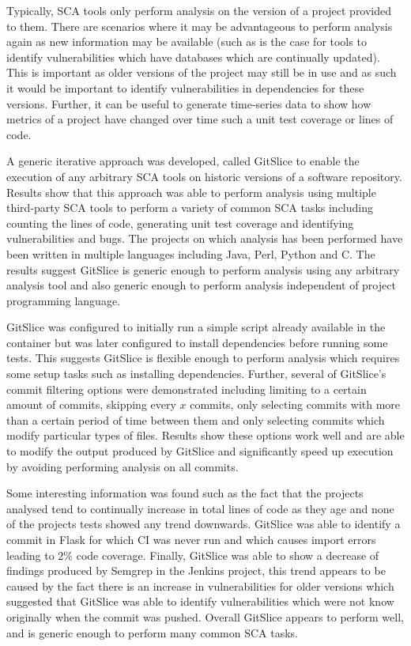 Typically, SCA tools only perform analysis on the version of a project provided to them.
There are scenarios where it may be advantageous to perform analysis again as new information may be available (such as is the case for tools to identify vulnerabilities which have databases which are continually updated).
This is important as older versions of the project may still be in use and as such it would be important to identify vulnerabilities in dependencies for these versions.
Further, it can be useful to generate time-series data to show how metrics of a project have changed over time such a unit test coverage or lines of code.

A generic iterative approach was developed, called GitSlice to enable the execution of any arbitrary SCA tools on historic versions of a software repository.
Results show that this approach was able to perform analysis using multiple third-party SCA tools to perform a variety of common SCA tasks including counting the lines of code, generating unit test coverage and identifying vulnerabilities and bugs.
The projects on which analysis has been performed have been written in multiple languages including Java, Perl, Python and C\@.
The results suggest GitSlice is generic enough to perform analysis using any arbitrary analysis tool and also generic enough to perform analysis independent of project programming language.

GitSlice was configured to initially run a simple script already available in the container but was later configured to install dependencies before running some tests.
This suggests GitSlice is flexible enough to perform analysis which requires some setup tasks such as installing dependencies.
Further, several of GitSlice's commit filtering options were demonstrated including limiting to a certain amount of commits, skipping every $ x $ commits, only selecting commits with more than a certain period of time between them and only selecting commits which modify particular types of files.
Results show these options work well and are able to modify the output produced by GitSlice and significantly speed up execution by avoiding performing analysis on all commits.

Some interesting information was found such as the fact that the projects analysed tend to continually increase in total lines of code as they age and none of the projects tests showed any trend downwards.
GitSlice was able to identify a commit in Flask for which CI was never run and which causes import errors leading to $ 2\% $ code coverage.
Finally, GitSlice was able to show a decrease of findings produced by Semgrep in the Jenkins project, this trend appears to be caused by the fact there is an increase in vulnerabilities for older versions which suggested that GitSlice was able to identify vulnerabilities which were not know originally when the commit was pushed.
Overall GitSlice appears to perform well, and is generic enough to perform many common SCA tasks.

